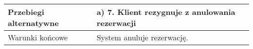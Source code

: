 \begin{tabularx}{\textwidth}{|l|X|}
Przebiegi alternatywne & a) 7. Klient rezygnuje z anulowania rezerwacji                                                                                                                                                                                                                                                                                                                                                \\ \hline
Warunki końcowe        & System anuluje rezerwację.                                                                                                                                                                                                                                                                                                                                                                    \\ \hline
\end{tabularx}
\newpage
